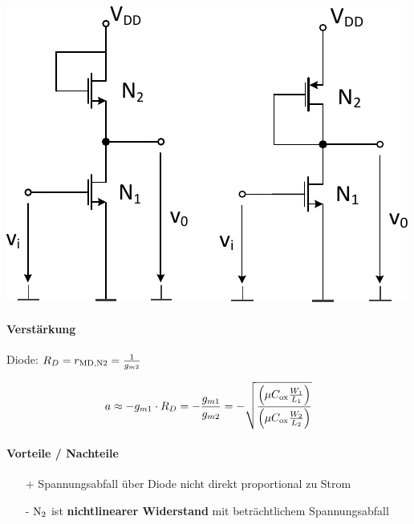 \begin{minipage}[t]{0.5\columnwidth}
    \includegraphics[width=\columnwidth, align=t]{images/07_verstaerker_mit_diodenlast.pdf}
\end{minipage}
\hfill
\begin{minipage}[t]{0.46\columnwidth}
    \paragraph{Verstärkung}

    Diode: $R_D = r_{\rm MD, N2} = \frac{1}{g_{m2}}$

    \vspace{-0.2cm}

    \[
        a \approx - g_{m1} \cdot R_D = - \frac{g_{m1}}{g_{m2}} = - \sqrt{\frac{\left( \mu C_{\rm ox} \frac{W_1}{L_1} \right)}{\left( \mu C_{\rm ox} \frac{W_2}{L_2} \right)}}
    \]

    \paragraph{Vorteile / Nachteile}

     \begin{itemize}
        \item[+] Spannungsabfall über Diode nicht direkt proportional zu Strom
        \item[-] $\rm N_{2}$ ist \textbf{nichtlinearer Widerstand} mit beträchtlichem Spannungsabfall
     \end{itemize}
\end{minipage}

\smallskip

